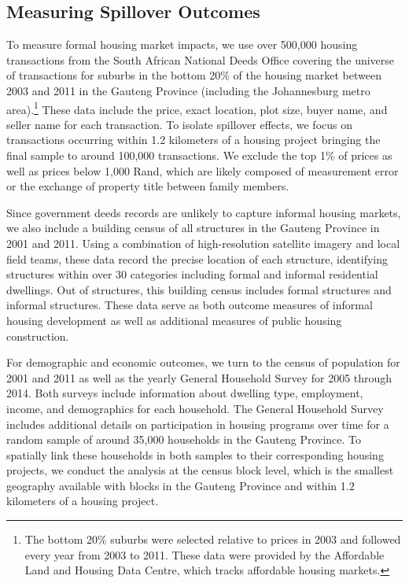 \documentclass[12pt]{article}
\begin{document}
\subsection{Measuring Spillover Outcomes}

To measure formal housing market impacts, we use over 500,000 housing transactions from the South African National Deeds Office covering the universe of transactions for suburbs in the bottom 20\% of the housing market between 2003 and 2011 in the Gauteng Province (including the Johannesburg metro area).\footnote{The bottom 20\% suburbs were selected relative to prices in 2003 and followed every year from 2003 to 2011.  These data were provided by the Affordable Land and Housing Data Centre, which tracks affordable housing markets.}  These data include the price, exact location, plot size, buyer name, and seller name for each transaction.  To isolate spillover effects, we focus on transactions occurring within 1.2 kilometers of a housing project bringing the final sample to around 100,000 transactions.  We exclude the top 1\% of prices as well as prices below 1,000 Rand, which are likely composed of measurement error or the exchange of property title between family members.

Since government deeds records are unlikely to capture informal housing markets, we also include a building census of all structures in the Gauteng Province in 2001 and 2011.  Using a combination of high-resolution satellite imagery and local field teams, these data record the precise location of each structure, identifying structures within over 30 categories including formal and informal residential dwellings.  Out of structures, this building census includes formal structures and informal structures.  These data serve as both outcome measures of informal housing development as well as additional measures of public housing construction.

For demographic and economic outcomes, we turn to the census of population for 2001 and 2011 as well as the yearly General Household Survey for 2005 through 2014.  Both surveys include information about dwelling type, employment, income, and demographics for each household.  The General Household Survey includes additional details on participation in housing programs over time for a random sample of around 35,000 households in the Gauteng Province.  To spatially link these households in both samples to their corresponding housing projects, we conduct the analysis at the census block level, which is the smallest geography available with blocks in the Gauteng Province and within 1.2 kilometers of a housing project.  
\end{document}
